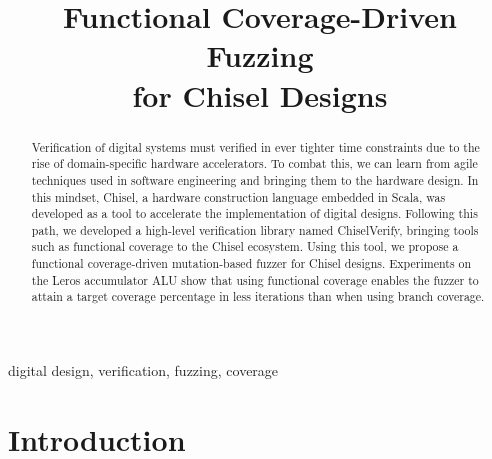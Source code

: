 \documentclass[conference]{IEEEtran}
\begin{document}

\title{Functional Coverage-Driven Fuzzing\\ for Chisel Designs}

\author{


}


\maketitle \thispagestyle{empty}

\begin{abstract}

Verification of digital systems must verified in ever tighter time constraints due to the rise of domain-specific hardware accelerators.
To combat this, we can learn from agile techniques used in software engineering and bringing them to the hardware design.
In this mindset, Chisel, a hardware construction language embedded in Scala, was developed as a tool to accelerate the implementation of digital designs.
Following this path, we developed a high-level verification library named ChiselVerify, bringing tools such as functional coverage to the Chisel ecosystem.
Using this tool, we propose a functional coverage-driven mutation-based fuzzer for Chisel designs.
Experiments on the Leros accumulator ALU show that using functional coverage enables the fuzzer to attain a target coverage percentage in less iterations than when using branch coverage.

\end{abstract}

\begin{IEEEkeywords}
digital design, verification, fuzzing, coverage
\end{IEEEkeywords}
\section{Introduction}
\label{sec:intro}
\end{document}
